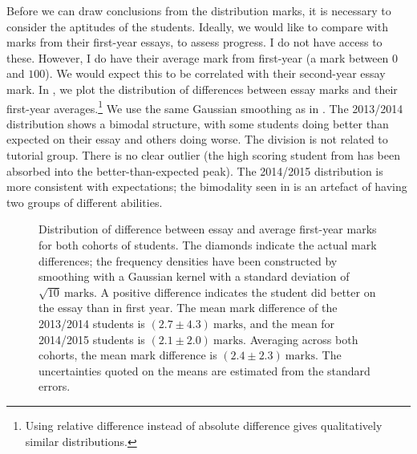 Before we can draw conclusions from the distribution marks, it is necessary to consider the aptitudes of the students. Ideally, we would like to compare with marks from their first-year essays, to assess progress. I do not have access to these. However, I do have their average mark from first-year (a mark between $0$ and $100$). We would expect this to be correlated with their second-year essay mark. In , we plot the distribution of differences between essay marks and their first-year averages.\footnote{Using relative difference instead of absolute difference gives qualitatively similar distributions.} We use the same Gaussian smoothing as in . The 2013/2014 distribution shows a bimodal structure, with some students doing better than expected on their essay and others doing worse. The division is not related to tutorial group. There is no clear outlier (the high scoring student from  has been absorbed into the better-than-expected peak). The 2014/2015 distribution is more consistent with expectations; the bimodality seen in  is an artefact of having two groups of different abilities.
\begin{figure}
  \centering
    \quad
\caption{Distribution of difference between essay and average first-year marks for both cohorts of students. The diamonds indicate the actual mark differences; the frequency densities have been constructed by smoothing with a Gaussian kernel with a standard deviation of $\sqrt{10}~\mathrm{marks}$. A positive difference indicates the student did better on the essay than in first year. The mean mark difference of the 2013/2014 students is $(2.7\pm4.3)~\mathrm{marks}$, and the mean for 2014/2015 students is $(2.1\pm2.0)~\mathrm{marks}$. Averaging across both cohorts, the mean mark difference is $(2.4\pm2.3)~\mathrm{marks}$. The uncertainties quoted on the means are estimated from the standard errors.}
  \label{fig:diff}
\end{figure}

